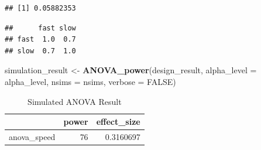 \documentclass[]{book}
\newenvironment{Shaded}{\begin{snugshade}}{\end{snugshade}}
\newcommand{\DataTypeTok}[1]{\textcolor[rgb]{0.13,0.29,0.53}{#1}}
\newcommand{\FloatTok}[1]{\textcolor[rgb]{0.00,0.00,0.81}{#1}}
\newcommand{\KeywordTok}[1]{\textcolor[rgb]{0.13,0.29,0.53}{\textbf{#1}}}
\newcommand{\NormalTok}[1]{#1}
\newcommand{\OperatorTok}[1]{\textcolor[rgb]{0.81,0.36,0.00}{\textbf{#1}}}
\newcommand{\OtherTok}[1]{\textcolor[rgb]{0.56,0.35,0.01}{#1}}
\newcommand{\StringTok}[1]{\textcolor[rgb]{0.31,0.60,0.02}{#1}}
\begin{document}
\begin{verbatim}
## [1] 0.05882353
\end{verbatim}

\begin{Shaded}
\end{Shaded}

\begin{verbatim}
##      fast slow
## fast  1.0  0.7
## slow  0.7  1.0
\end{verbatim}

\begin{Shaded}
\begin{Highlighting}[]
\NormalTok{simulation_result <-}\StringTok{ }\KeywordTok{ANOVA_power}\NormalTok{(design_result, }
                                 \DataTypeTok{alpha_level =}\NormalTok{ alpha_level, }
                                 \DataTypeTok{nsims =}\NormalTok{ nsims,}
                                 \DataTypeTok{verbose =} \OtherTok{FALSE}\NormalTok{)}
\end{Highlighting}
\end{Shaded}

\begin{table}[t]

\caption{\label{tab:unnamed-chunk-74}Simulated ANOVA Result}
\centering
\begin{tabular}{l|r|r}
\hline
  & power & effect\_size\\
\hline
anova\_speed & 76 & 0.3160697\\
\hline
\end{tabular}
\end{table}
\end{document}
